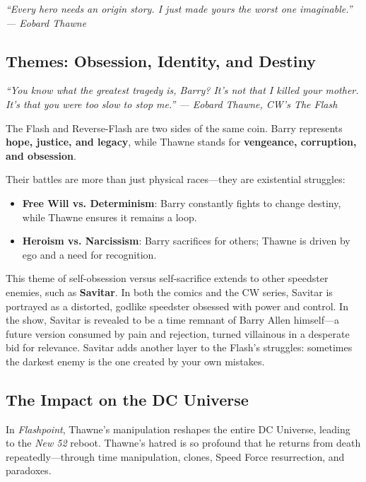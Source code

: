 \documentclass[a4paper,10pt,twocolumn]{memoir}
\newenvironment{magquote}
  {\begin{shaded*}\itshape\small}
  {\end{shaded*}}
\begin{document}
\begin{magquote}
“Every hero needs an origin story. I just made yours the worst one imaginable.”
\hfill --- Eobard Thawne
\end{magquote}

\subsection*{Themes: Obsession, Identity, and Destiny}
\begin{magquote}
“You know what the greatest tragedy is, Barry? It’s not that I killed your mother. It’s that you were too slow to stop me.”  
\hfill --- Eobard Thawne, \textit{CW's The Flash}
\end{magquote}

The Flash and Reverse-Flash are two sides of the same coin. Barry represents \textbf{hope, justice, and legacy}, while Thawne stands for \textbf{vengeance, corruption, and obsession}.

Their battles are more than just physical races---they are existential struggles:
\begin{itemize}
  \item \textbf{Free Will vs. Determinism}: Barry constantly fights to change destiny, while Thawne ensures it remains a loop.
  \item \textbf{Heroism vs. Narcissism}: Barry sacrifices for others; Thawne is driven by ego and a need for recognition.
\end{itemize}

This theme of self-obsession versus self-sacrifice extends to other speedster enemies, such as \textbf{Savitar}. In both the comics and the CW series, Savitar is portrayed as a distorted, godlike speedster obsessed with power and control. In the show, Savitar is revealed to be a time remnant of Barry Allen himself---a future version consumed by pain and rejection, turned villainous in a desperate bid for relevance. Savitar adds another layer to the Flash's struggles: sometimes the darkest enemy is the one created by your own mistakes.

\subsection*{The Impact on the DC Universe}
In \textit{Flashpoint}, Thawne’s manipulation reshapes the entire DC Universe, leading to the \textit{New 52} reboot. Thawne’s hatred is so profound that he returns from death repeatedly---through time manipulation, clones, Speed Force resurrection, and paradoxes.
\end{document}
